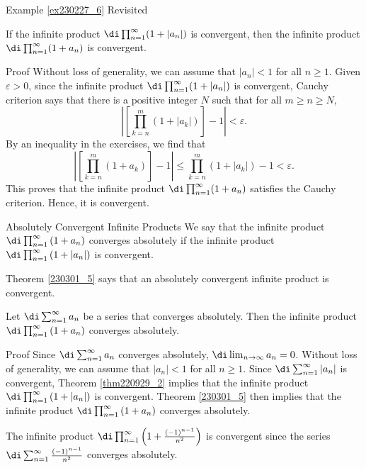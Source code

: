 \begin{example}{\linkt Example \ref{ex230227_6} Revisited}
\begin{example}[label=ex230227_13]{}
\begin{example}{}
\begin{theorem}[label=230301_5]{}
 If the infinite product $\di\prod_{n=1}^{\infty}(1+|a_n|)$ is convergent, then the infinite product  $\di\prod_{n=1}^{\infty}(1+a_n)$ is convergent.
\end{theorem}
\begin{myproof}{Proof} Without loss of generality, we can assume that $|a_n|<1$ for all $n\geq 1$. Given $\varepsilon>0$,
since the infinite product $\di\prod_{n=1}^{\infty}(1+|a_n|)$ is convergent, 
  Cauchy criterion says that there is a  positive integer $N$ such that for all $m\geq n\geq N$, 
\[\left|\left[\prod_{k=n}^m(1+|a_k|)\right]-1\right|<\varepsilon.\]  By an inequality  in the exercises, we find that
\[\left|\left[\prod_{k=n}^m(1+ a_k )\right]-1\right|\leq \prod_{k=n}^m(1+|a_k|)-1<\varepsilon.\]
 This proves that the infinite product $\di\prod_{n=1}^{\infty}(1+a_n)$ satisfies the Cauchy criterion. Hence, it is convergent.
\end{myproof}
\begin{definition}{Absolutely Convergent Infinite Products}
 We say that the infinite product
$\di \prod_{n=1}^{\infty}\left(1+a_n\right)$
converges absolutely if  the infinite product
$\di\prod_{n=1}^{\infty}\left(1+|a_n|\right)$
is  convergent. 
\end{definition} Theorem \ref{230301_5} says that  an absolutely convergent infinite product  is convergent.
 \begin{corollary}
{}
Let $\di \sum_{n=1}^{\infty}a_n$ be a series that converges absolutely. Then the infinite product $\di\prod_{n=1}^{\infty}\left(1+a_n\right)$ converges absolutely.
\end{corollary}



\begin{myproof}{Proof}
Since $\di\sum_{n=1}^{\infty}a_n$ converges absolutely, $\di\lim_{n\to\infty}a_n=0$. Without loss of generality, we can assume that $|a_n|<1$ for all $n\geq 1$.   Since $\di\sum_{n=1}^{\infty}|a_n|$ is convergent, Theorem \ref{thm220929_2} implies that the infinite product $\di\prod_{n=1}^{\infty}\left(1+|a_n|\right)$ is convergent. Theorem \ref{230301_5} then implies that the infinite product $\di\prod_{n=1}^{\infty}\left(1+a_n\right)$ converges absolutely.
\end{myproof}
\begin{example}{}
The infinite product $\di\prod_{n=1}^{\infty}\left(1+\frac{(-1)^{n-1}}{n^2}\right)$ is convergent since the series $\di\sum_{n=1}^{\infty}\frac{(-1)^{n-1}}{n^2}$ converges absolutely.
\end{example}
 

\end{example}
\end{example}
\end{example}
